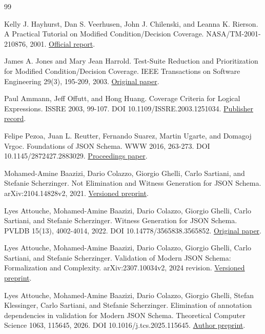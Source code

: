 \documentclass[sigconf,nonacm]{acmart}
\begin{document}
\begin{thebibliography}{99}
\small
\raggedright
{} Kelly J. Hayhurst, Dan S. Veerhusen, John J. Chilenski, and Leanna K. Rierson. A Practical Tutorial on Modified Condition/Decision Coverage. NASA/TM-2001-210876, 2001. \href{https://ntrs.nasa.gov/citations/20010057789}{Official report}.

 James A. Jones and Mary Jean Harrold. Test-Suite Reduction and Prioritization for Modified Condition/Decision Coverage. IEEE Transactions on Software Engineering 29(3), 195-209, 2003. \href{https://bowringj.people.charleston.edu/docs/tse03-mcdc.pdf}{Original paper}.

 Paul Ammann, Jeff Offutt, and Hong Huang. Coverage Criteria for Logical Expressions. ISSRE 2003, 99-107. DOI 10.1109/ISSRE.2003.1251034. \href{https://doi.org/10.1109/ISSRE.2003.1251034}{Publisher record}.

 Felipe Pezoa, Juan L. Reutter, Fernando Suarez, Martin Ugarte, and Domagoj Vrgoc. Foundations of JSON Schema. WWW 2016, 263-273. DOI 10.1145/2872427.2883029. \href{https://archives.iw3c2.org/www2016/WWW2016-Proceedings/proceedings/p263.pdf}{Proceedings paper}.

 Mohamed-Amine Baazizi, Dario Colazzo, Giorgio Ghelli, Carlo Sartiani, and Stefanie Scherzinger. Not Elimination and Witness Generation for JSON Schema. arXiv:2104.14828v2, 2021. \href{https://arxiv.org/abs/2104.14828v2}{Versioned preprint}.

 Lyes Attouche, Mohamed-Amine Baazizi, Dario Colazzo, Giorgio Ghelli, Carlo Sartiani, and Stefanie Scherzinger. Witness Generation for JSON Schema. PVLDB 15(13), 4002-4014, 2022. DOI 10.14778/3565838.3565852. \href{https://www.vldb.org/pvldb/vol15/p4002-sartiani.pdf}{Original paper}.

 Lyes Attouche, Mohamed-Amine Baazizi, Dario Colazzo, Giorgio Ghelli, Carlo Sartiani, and Stefanie Scherzinger. Validation of Modern JSON Schema: Formalization and Complexity. arXiv:2307.10034v2, 2024 revision. \href{https://arxiv.org/abs/2307.10034v2}{Versioned preprint}.

 Lyes Attouche, Mohamed-Amine Baazizi, Dario Colazzo, Giorgio Ghelli, Stefan Klessinger, Carlo Sartiani, and Stefanie Scherzinger. Elimination of annotation dependencies in validation for Modern JSON Schema. Theoretical Computer Science 1063, 115645, 2026. DOI 10.1016/j.tcs.2025.115645. \href{https://arxiv.org/abs/2503.11288}{Author preprint}.


\end{thebibliography}
\end{document}
